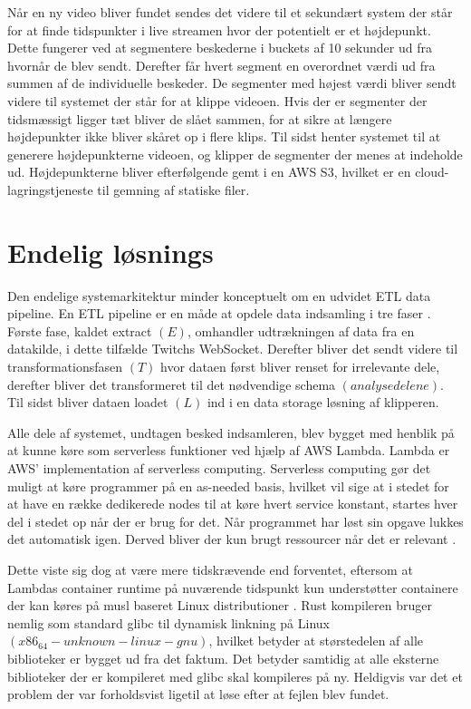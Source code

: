 \documentclass{article}
\begin{document}
Når en ny video bliver fundet sendes det videre til et sekundært system der står for at finde tidspunkter i live streamen hvor der potentielt er et højdepunkt. Dette fungerer ved at segmentere beskederne i buckets af 10 sekunder ud fra hvornår de blev sendt. Derefter får hvert segment en overordnet værdi ud fra summen af de individuelle beskeder. De segmenter med højest værdi bliver sendt videre til systemet der står for at klippe videoen. Hvis der er segmenter der tidsmæssigt ligger tæt bliver de slået sammen, for at sikre at længere højdepunkter ikke bliver skåret op i flere klips.
Til sidst henter systemet til at generere højdepunkterne videoen, og klipper de segmenter der menes at indeholde ud. Højdepunkterne bliver efterfølgende gemt i en AWS S3, hvilket er en cloud-lagringstjeneste til gemning af statiske filer.

\section{Endelig løsnings}
Den endelige systemarkitektur minder konceptuelt om en udvidet ETL data pipeline. En ETL pipeline er en måde at opdele data indsamling i tre faser \cite{fatima_2022}. Første fase, kaldet extract \((E)\), omhandler udtrækningen af data fra en datakilde, i dette tilfælde Twitchs WebSocket. Derefter bliver det sendt videre til transformationsfasen \((T)\) hvor dataen først bliver renset for irrelevante dele, derefter bliver det transformeret til det nødvendige schema \((analyse delene)\). Til sidst bliver dataen loadet \((L)\) ind i en data storage løsning af klipperen.

Alle dele af systemet, undtagen besked indsamleren, blev bygget med henblik på at kunne køre som serverless funktioner ved hjælp af AWS Lambda. Lambda er AWS’ implementation af serverless computing. Serverless computing gør det muligt at køre programmer på en as-needed basis, hvilket vil sige at i stedet for at have en række dedikerede nodes til at køre hvert service konstant, startes hver del i stedet op når der er brug for det. Når programmet har løst sin opgave lukkes det automatisk igen. Derved bliver der kun brugt ressourcer når det er relevant \cite{cloudflare_what_nodate}.

Dette viste sig dog at være mere tidskrævende end forventet, eftersom at Lambdas container runtime på nuværende tidspunkt kun understøtter containere der kan køres på musl baseret Linux distributioner \cite{amazon_using_sdk}. Rust kompileren bruger nemlig som standard glibc til dynamisk linkning på Linux \((x86_64-unknown-linux-gnu)\), hvilket betyder at størstedelen af alle biblioteker er bygget ud fra det faktum. Det betyder samtidig at alle eksterne biblioteker der er kompileret med glibc skal kompileres på ny. Heldigvis var det et problem der var forholdsvist ligetil at løse efter at fejlen blev fundet.
\end{document}
